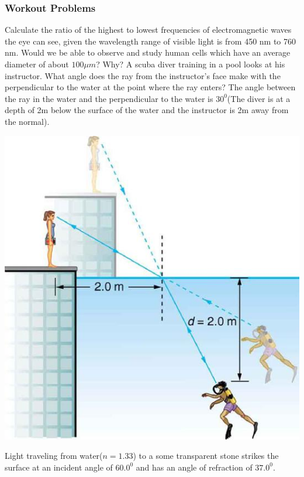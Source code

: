 \documentclass[12pt,addpoints]{exam}
\begin{document}
{{{\begin{questions}
					\subsubsection*{Workout Problems}
					\question Calculate the ratio of the highest to lowest frequencies of electromagnetic waves the eye can see, given the wavelength range of visible light is from 450 nm to 760 nm. Would we be able to observe and study human cells  which have an average diameter of about $100\mu m$? Why?\vspace{1.5in}
					\question A scuba diver training in a pool looks at his instructor. What angle does the ray from the instructor’s face make with the perpendicular to the water at the point where the ray enters? The angle between the ray in the water and the perpendicular to the water is $30^0$(The diver is at a depth of 2m below the surface of the water and the instructor is 2m away from the normal).
					\begin{center}
						\includegraphics[scale=0.3]{1}
					\end{center} \vspace{1in}
					\question Light traveling from water($n=1.33$) to a some transparent stone strikes the surface at an incident angle of $60.0^0$ and has an angle of refraction of $37.0^0$.
					\begin{itemize}

\end{itemize}
\end{questions}}}}
\end{document}
